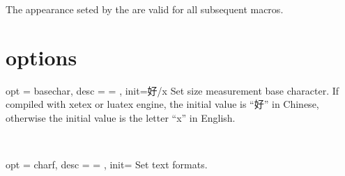 \documentclass[full]{l3doc}
\begin{document}
\begin{documentation}
  The appearance seted by the  are 
  valid for all subsequent macros.

\section{options}

\begin{option}{ opt = basechar, desc = {= }, init=好/x }
  Set size measurement base character. If compiled with xetex or luatex engine,
  the initial value is ``好'' in Chinese, otherwise the initial value is the 
  letter ``x'' in English.
\end{option}\\
\begin{SideBySideExample}[frame=single,numbers=left,xrightmargin=.45\linewidth,gobble=2]
  \centering
  \quad
  \quad
\end{SideBySideExample}

\bigskip

\begin{option}{ opt = charf, desc = {= }, init= }
  Set text formats.
\end{option}\\
\begin{SideBySideExample}[frame=single,numbers=left,xrightmargin=.45\linewidth,gobble=2]
  \centering
  \qquad
\end{SideBySideExample}

\bigskip


\end{documentation}
\end{document}
